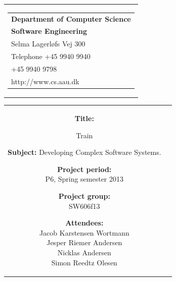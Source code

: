 \thispagestyle{empty}
\begin{titlepage}
\begin{nopagebreak}
\setcounter{page}{3}
{\samepage 
\begin{tabular}{r}
\parbox{\textwidth}{  
\hfill \parbox{4.9cm}{\begin{tabular}{l}
{\sf\small \textbf{Department of Computer Science }}\\
{\sf\small  \textbf{Software Engineering}} \\
{\sf\small Selma Lagerløfs Vej 300} \\
{\sf\small Telephone +45 9940 9940} \\
{\sf\small +45 9940 9798} \\
{\sf\small http://www.cs.aau.dk}
\end{tabular}}}
\\
\end{tabular}

\begin{tabular}{cc}
\parbox{6cm}{
\begin{description}

\item {\bf Title:} 

Train
  
\item {\bf Subject:} 
Developing Complex Software Systems.

\end{description}

\parbox{8cm}{

\begin{description}
\item {\bf Project period:}\\
   P6, Spring semester 2013\\
  \hspace{4cm}
\item {\bf Project group:}\\
  SW606f13\\
  \hspace{4cm}
\item {\bf Attendees:}\\
Jacob Karstensen Wortmann \\
Jesper Riemer Andersen \\
Nicklas Andersen \\
Simon Reedtz Olesen \\


\end{description}}}
\end{tabular}}
\end{nopagebreak}
\end{titlepage}
